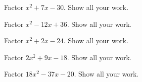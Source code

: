 \documentclass[11pt,letterpaper]{article}
\begin{document}

 Factor $x^2 + 7x - 30$. Show all your work. 

\newpage

 Factor $x^2 - 12x + 36$. Show all your work. 

\newpage


 Factor $x^2 + 2x - 24$. Show all your work. 

\newpage


 Factor $2x^2 + 9x - 18$. Show all your work. 

\newpage


 Factor $18x^2 - 37x - 20$. Show all your work. 






\end{document}
